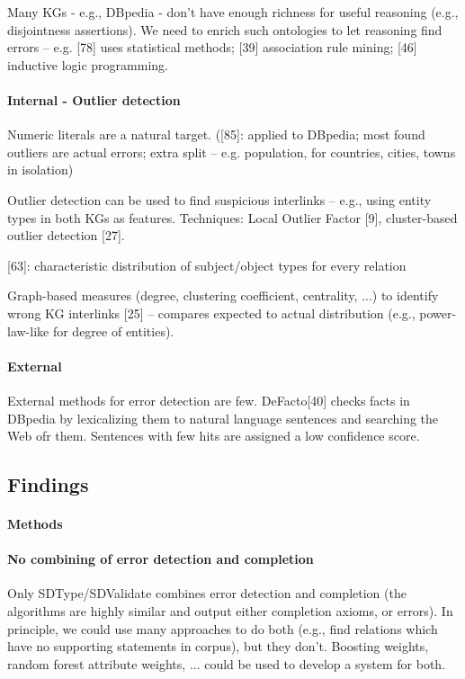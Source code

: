Many KGs - e.g., DBpedia - don't have enough richness for useful reasoning
(e.g., disjointness assertions). We need to enrich such ontologies to let
reasoning find errors -- e.g. [78] uses statistical methods; [39] association
rule mining; [46] inductive logic programming.

\paragraph{Internal - Outlier detection}
Numeric literals are a natural target. ([85]: applied to DBpedia; most found
outliers are actual errors; extra split -- e.g. population, for countries,
cities, towns in isolation)

Outlier detection can be used to find suspicious interlinks -- e.g., using
entity types in both KGs as features.
Techniques: Local Outlier Factor [9], cluster-based outlier detection [27].

[63]: characteristic distribution of subject/object types for every relation

Graph-based measures (degree, clustering coefficient, centrality, ...) to
identify wrong KG interlinks [25] -- compares expected to actual distribution
(e.g., power-law-like for degree of entities).

\paragraph{External}
External methods for error detection are few.
DeFacto[40] checks facts in DBpedia by lexicalizing them to natural language
sentences and searching the Web ofr them. Sentences with few hits are assigned
a low confidence score.

\subsection{Findings}

\paragraph{Methods}

\paragraph{No combining of error detection and completion}
Only SDType/SDValidate combines error detection and completion (the algorithms
are highly similar and output either completion axioms, or errors).
In principle, we could use many approaches to do both (e.g., find relations
which have no supporting statements in corpus), but they don't.
Boosting weights, random forest attribute weights, ... could be used to develop
a system for both.

